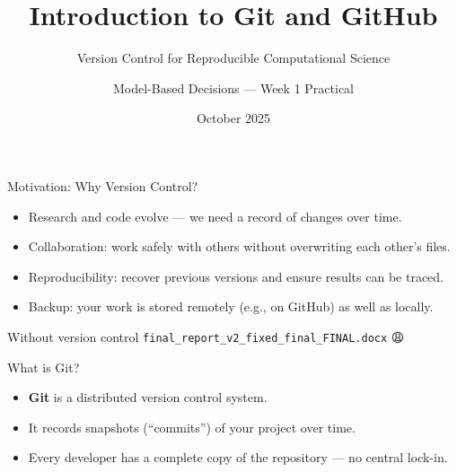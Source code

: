 \documentclass[aspectratio=169,13pt]{beamer}
\title{Introduction to Git and GitHub}
\subtitle{Version Control for Reproducible Computational Science}
\author{Model-Based Decisions — Week 1 Practical}
\institute{Computational Science Lab, University of Amsterdam}
\date{October 2025}
\begin{document}
\begin{frame}
    \titlepage
\end{frame}

\begin{frame}{Motivation: Why Version Control?}
    \begin{itemize}
        \item Research and code evolve — we need a record of changes over time.
        \item Collaboration: work safely with others without overwriting each other's files.
        \item Reproducibility: recover previous versions and ensure results can be traced.
        \item Backup: your work is stored remotely (e.g., on GitHub) as well as locally.
    \end{itemize}
    \pause
    \vspace{1em}
    \begin{block}{Without version control}
        \texttt{final\_report\_v2\_fixed\_final\_FINAL.docx} 😩
    \end{block}
\end{frame}

\begin{frame}{What is Git?}
    \begin{itemize}
        \item \textbf{Git} is a distributed version control system.
        \item It records snapshots (“commits”) of your project over time.
        \item Every developer has a complete copy of the repository — no central lock-in.
    \end{itemize}

    \begin{center}
    \end{center}
\end{frame}
\end{document}
